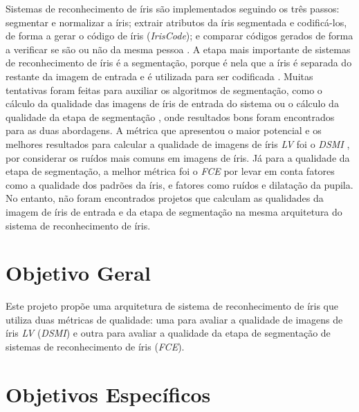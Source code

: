 \par Sistemas de reconhecimento de íris são implementados seguindo os três passos: segmentar e normalizar a íris; extrair atributos da íris segmentada e codificá-los, de forma a gerar o código de íris (\textit{IrisCode}); e comparar códigos gerados de forma a verificar se são ou não da mesma pessoa \cite{wayman2005biometric}. A etapa mais importante de sistemas de reconhecimento de íris é a segmentação, porque é nela que a íris é separada do restante da imagem de entrada e é utilizada para ser codificada \cite{daugman2004}. Muitas tentativas foram feitas para auxiliar os algoritmos de segmentação, como o cálculo da qualidade das imagens de íris de entrada do sistema \cite{Jenadeleh_2018_CVPR_Workshops, daugman2004, starovoitov2013-DSMI-45, wan2007-DSMI-50, bergmller2017-DSMI-2, chen2013-DSMI-4, kalka2010-DSMI-18, li2011} ou o cálculo da qualidade da etapa de segmentação \cite{du2010, belcher2008, proenca2011, mottalli2009-DSMI-30, ma2003-FIM-7}, onde resultados bons foram encontrados para as duas abordagens. A métrica que apresentou o maior potencial e os melhores resultados para calcular a qualidade de imagens de íris \textit{\acrshort{LV}} foi o \textit{\acrfull{DSMI}} \cite{Jenadeleh_2018_CVPR_Workshops}, por considerar os ruídos mais comuns em imagens de íris. Já para a qualidade da etapa de segmentação, a melhor métrica foi o \textit{\acrfull{FCE}} \cite{du2010} por levar em conta fatores como a qualidade dos padrões da íris, e fatores como ruídos e dilatação da pupila. No entanto, não foram encontrados projetos que calculam as qualidades da imagem de íris de entrada e da etapa de segmentação na mesma arquitetura do sistema de reconhecimento de íris.

\section{Objetivo Geral}

\par Este projeto propõe uma arquitetura de sistema de reconhecimento de íris que utiliza duas métricas de qualidade: uma para avaliar a qualidade de imagens de íris \textit{\acrshort{LV}} (\textit{\acrshort{DSMI}}) e outra para avaliar a qualidade da etapa de segmentação de sistemas de reconhecimento de íris (\textit{\acrshort{FCE}}).

\section{Objetivos Específicos}

